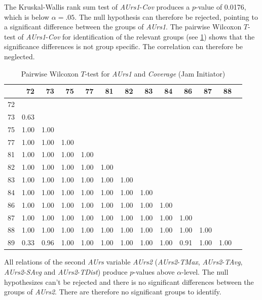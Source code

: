 The Kruskal-Wallis rank sum test of \textit{AUrs1}-\textit{Cov} produces a $p$-value of 0.0176, which is below $\alpha=.05$. The null hypothesis can therefore be rejected, pointing to a significant difference between the groups of \textit{AUrs1}. The pairwise Wilcoxon $T$-test of \textit{AUrs1}-\textit{Cov} for identification of the relevant groups (see \cref{tbl:wilcoxon_baysis_initiator_AUrs1_Cov}) shows that the significance differences is not group specific. The correlation can therefore be neglected.
\begin{table}[ht]
	\small
	\centering
    \begin{tabular}{rrrrrrrrrrrrr}
        \toprule
           & 72 & 73 & 75 & 77 & 81 & 82 & 83 & 84 & 86 & 87 & 88 \\ 
        \midrule
        72 &  &  &  &  &  &  &  &  &  &  &  \\ 
        73 & 0.63 &  &  &  &  &  &  &  &  &  &  \\ 
        75 & 1.00 & 1.00 &  &  &  &  &  &  &  &  &  \\ 
        77 & 1.00 & 1.00 & 1.00 &  &  &  &  &  &  &  &  \\ 
        81 & 1.00 & 1.00 & 1.00 & 1.00 &  &  &  &  &  &  &  \\ 
        82 & 1.00 & 1.00 & 1.00 & 1.00 & 1.00 &  &  &  &  &  &  \\ 
        83 & 1.00 & 1.00 & 1.00 & 1.00 & 1.00 & 1.00 &  &  &  &  &  \\ 
        84 & 1.00 & 1.00 & 1.00 & 1.00 & 1.00 & 1.00 & 1.00 &  &  &  &  \\ 
        86 & 1.00 & 1.00 & 1.00 & 1.00 & 1.00 & 1.00 & 1.00 & 1.00 &  &  &  \\ 
        87 & 1.00 & 1.00 & 1.00 & 1.00 & 1.00 & 1.00 & 1.00 & 1.00 & 1.00 &  &  \\ 
        88 & 1.00 & 1.00 & 1.00 & 1.00 & 1.00 & 1.00 & 1.00 & 1.00 & 1.00 & 1.00 &  \\ 
        89 & 0.33 & 0.96 & 1.00 & 1.00 & 1.00 & 1.00 & 1.00 & 1.00 & 0.91 & 1.00 & 1.00 \\ 
        \bottomrule
    \end{tabular}
    \caption{Pairwise Wilcoxon $T$-test for \textit{AUrs1} and \textit{Coverage} (Jam Initiator)}
    \label{tbl:wilcoxon_baysis_initiator_AUrs1_Cov}
\end{table}

\medskip
All relations of the second \textit{AUrs} variable \textit{AUrs2} (\textit{AUrs2}-\textit{TMax}, \textit{AUrs2}-\textit{TAvg}, \textit{AUrs2}-\textit{SAvg} and \textit{AUrs2}-\textit{TDist}) produce $p$-values above $\alpha$-level. The null hypothesizes can't be rejected and there is no significant differences between the groups of \textit{AUrs2}. There are therefore no significant groups to identify.

